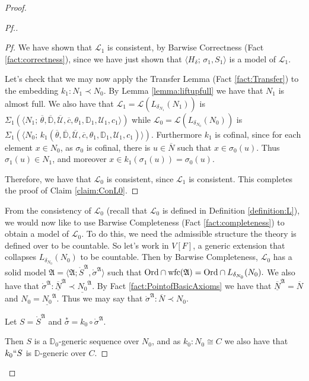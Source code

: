 \documentclass{amsart}
\theoremstyle{definition}
\theoremstyle{remark}
\newcommand{\D}{\mathbb{D}}
\newcommand{\N}{{\overline{N}}}
\newcommand{\U}{\mathcal{U}}
\newcommand{\Ord}{\textup{\ensuremath{\text{Ord}}}}
\DeclareMathOperator{\wfc}{wfc}
\begin{document}
\begin{proof}
\begin{proof}[Pf.]
\begin{proof}[Pf]
We have shown that $\mathcal L_1$ is consistent, by Barwise Correctness (Fact \ref{fact:correctness}), since we have just shown that $\langle H_{\delta}; \, \sigma_1, S_1 \rangle$ is a model of $\mathcal L_1$.

Let's check that we may now apply the Transfer Lemma (Fact \ref{fact:Transfer}) to the embedding $k_1:N_1 \prec N_0$. By Lemma \ref{lemma:liftupfull} we have that $N_1$ is almost full. We also have that $\mathcal L_1 = \mathcal L(L_{\delta_{N_1}}(N_1))$ is 
	$\text{$\Sigma_1(\langle N_1; \, \overline \theta, \overline{\D}, \overline{\U}, \overline c, \theta_1, \D_1, \U_1, c_1 \rangle)$}$ while $\mathcal L_0=\mathcal L(L_{\delta_{N_0}}(N_0))$ is 
	$\text{$\Sigma_1(\langle N_0;\,k_1(\overline \theta, \overline{\D}, \overline{\U}, \overline c, \theta_1, \D_1, \U_1, c_1)\rangle)$.}$
Furthermore $k_1$ is cofinal, since for each element $x \in N_0$, as $\sigma_0$ is cofinal, there is $u \in \N$ such that $x \in \sigma_0(u)$. Thus $\sigma_1(u) \in N_1$, and moreover $x \in k_1(\sigma_1(u))=\sigma_0(u)$. 

Therefore, we have that $\mathcal L_0$ is consistent, since $\mathcal L_1$ is consistent. This completes the proof of Claim \ref{claim:ConL0}. \end{proof}

From the consistency of $\mathcal L_0$ (recall that $\mathcal L_0$ is defined in Definition \ref{definition:L}), we would now like to use Barwise Completeness (Fact \ref{fact:completeness}) to obtain a model of $\mathcal L_0$. To do this, we need the admissible structure the theory is defined over to be countable. So let's work in $V[F]$, a generic extension that collapses $L_{\delta_{N_0}}(N_0)$ to be countable. Then by Barwise Completeness, $\mathcal L_0$ has a solid model 
	$\mathfrak A = \langle \mathfrak A; \mathring{S}^{\mathfrak A}, \mathring{\sigma}^{\mathfrak A} \rangle$ such that $\Ord \cap \wfc(\mathfrak A) = \Ord \cap L_{\delta_{N_0}}(N_0).$
We also have that $\mathring \sigma^{\mathfrak A}: \overline{\underline N}^{\mathfrak A} \prec \underline{N_0}^{\mathfrak A}$. By Fact \ref{fact:PointofBasicAxioms} we have that $\overline{\underline N}^{\mathfrak A}=\N$ and $N_0=\underline{N_0}^{\mathfrak A}$. Thus we may say that  $\mathring \sigma^{\mathfrak A}: \N \prec N_0$. 

Let $S = \mathring{S}^{\mathfrak A}$ and $\overset{*} {\sigma}=k_0 \circ \mathring{\sigma}^{\mathfrak A}$. 

Then $S$ is a $\D_0$-generic sequence over $N_0$, and as $k_0:N_0 \cong C$ we also have that $k_0``S$ is $\D$-generic over $C$. 


\end{proof}
\end{proof}
\end{document}

